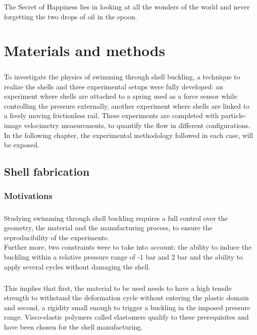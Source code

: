 \begin{savequote}
The Secret of Happiness lies in looking at all the wonders of the world and never forgetting the two drops of oil in the spoon.
\end{savequote}
\chapter{Materials and methods}
\newpage
\paragraph{}
To investigate the physics of swimming through shell buckling, a technique to realize the shells and  three experimental setups were fully developed: an experiment where shells are attached to a spring used as a force sensor while controlling the pressure externally, another experiment where shells are linked to a freely moving frictionless rail. These experiments are completed with particle-image velocimetry measurements, to quantify the flow in different configurations. In the following chapter, the experimental methodology followed in each case, will be exposed. 
\section{Shell fabrication}
\subsection{Motivations}
\paragraph{}
Studying swimming through shell buckling requires a full control over the geometry, the material and the manufacturing process, to ensure the reproducibility of the experiments.\\
Further more, two constraints were to take into account: the ability to induce the buckling within a relative pressure range of -1 bar and 2 bar and the ability to apply several cycles without damaging the shell. 
\paragraph{}
This implies that first, the material to be used needs to have a high tensile strength to withstand the deformation cycle without entering the plastic domain and second, a rigidity small enough to trigger a buckling in the imposed pressure range. Visco-elastic polymers called elastomers qualify to these prerequisites and have been chosen for the shell manufacturing.
